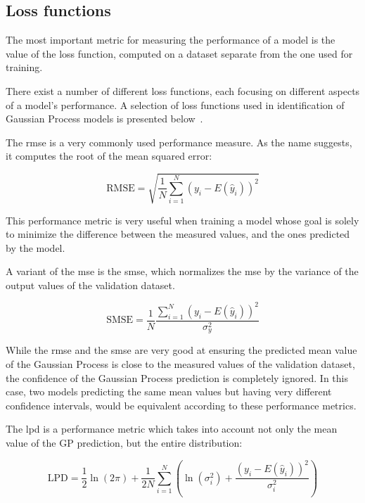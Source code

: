 \subsection{Loss functions}

The most important metric for measuring the performance of a model is the value
of the loss function, computed on a dataset separate from the one used for
training.

There exist a number of different loss functions, each focusing on different
aspects of a model's performance. A selection of loss functions used in
identification of Gaussian Process models is presented
below~\cite{kocijanModellingControlDynamic2016}.

The \acrfull{rmse} is a very commonly used performance measure. As the name
suggests, it computes the root of the mean squared error:

\begin{equation}\label{eq:rmse}
    \text{RMSE} = \sqrt{\frac{1}{N}\sum_{i=1}^N \left(y_i -
    E(\hat{y}_i)\right)^{2}}
\end{equation}

This performance metric is very useful when training a model whose goal is
solely to minimize the difference between the measured values, and the ones
predicted by the model.

A variant of the \acrshort{mse} is the \acrfull{smse}, which normalizes the
\acrlong{mse} by the variance of the output values of the validation dataset.

\begin{equation}\label{eq:smse}
    \text{SMSE} = \frac{1}{N}\frac{\sum_{i=1}^N \left(y_i -
    E(\hat{y}_i)\right)^{2}}{\sigma_y^2}
\end{equation}

While the \acrshort{rmse} and the \acrshort{smse} are very good at ensuring the
predicted mean value of the Gaussian Process is close to the measured values of
the validation dataset, the confidence of the Gaussian Process prediction is
completely ignored. In this case, two models predicting the same mean values but
having very different confidence intervals, would be equivalent according to these
performance metrics.

The \acrfull{lpd} is a performance metric which takes into account not only the
mean value of the GP prediction, but the entire distribution:

\begin{equation}
    \text{LPD} = \frac{1}{2} \ln{\left(2\pi\right)} + \frac{1}{2N}
    \sum_{i=1}^N\left(\ln{\left(\sigma_i^2\right)} + \frac{\left(y_i -
    E(\hat{y}_i)\right)^{2}}{\sigma_i^2}\right)
\end{equation}

